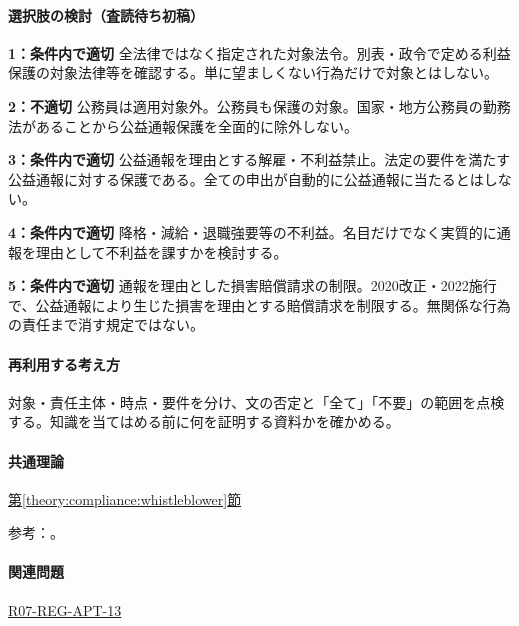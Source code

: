 \paragraph{選択肢の検討（査読待ち初稿）}\mbox{}\par

\noindent\textbf{1：条件内で適切} 全法律ではなく指定された対象法令。別表・政令で定める利益保護の対象法律等を確認する。単に望ましくない行為だけで対象とはしない。\par

\noindent\textbf{2：不適切} 公務員は適用対象外。公務員も保護の対象。国家・地方公務員の勤務法があることから公益通報保護を全面的に除外しない。\par

\noindent\textbf{3：条件内で適切} 公益通報を理由とする解雇・不利益禁止。法定の要件を満たす公益通報に対する保護である。全ての申出が自動的に公益通報に当たるとはしない。\par

\noindent\textbf{4：条件内で適切} 降格・減給・退職強要等の不利益。名目だけでなく実質的に通報を理由として不利益を課すかを検討する。\par

\noindent\textbf{5：条件内で適切} 通報を理由とした損害賠償請求の制限。2020改正・2022施行で、公益通報により生じた損害を理由とする賠償請求を制限する。無関係な行為の責任まで消す規定ではない。\par

\paragraph{再利用する考え方} 対象・責任主体・時点・要件を分け、文の否定と「全て」「不要」の範囲を点検する。知識を当てはめる前に何を証明する資料かを確かめる。

\paragraph{共通理論} \hyperref[theory:compliance:whistleblower]{第\ref*{theory:compliance:whistleblower}節}

\par 参考：\cite{caa_amend2020,caa_current_faq,saf53_whistle_oldpublic}。

\paragraph{関連問題} \hyperref[q:r07-reg-apt-13]{R07-REG-APT-13}

